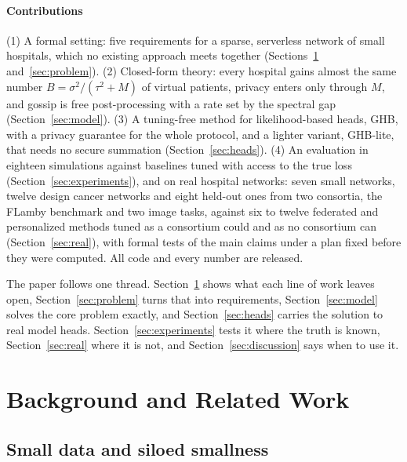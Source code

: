 \documentclass[acmsmall,screen,review]{acmart}
\theoremstyle{acmdefinition}
\begin{document}
\paragraph{Contributions} (1) A formal setting: five requirements for a sparse, serverless network of small hospitals, which no existing approach meets together (Sections~\ref{sec:related} and~\ref{sec:problem}). (2) Closed-form theory: every hospital gains almost the same number $B=\sigma^2/(\tau^2+M)$ of virtual patients, privacy enters only through $M$, and gossip is free post-processing with a rate set by the spectral gap (Section~\ref{sec:model}). (3) A tuning-free method for likelihood-based heads, GHB, with a privacy guarantee for the whole protocol, and a lighter variant, GHB-lite, that needs no secure summation (Section~\ref{sec:heads}). (4) An evaluation in eighteen simulations against baselines tuned with access to the true loss (Section~\ref{sec:experiments}), and on real hospital networks: seven small networks, twelve design cancer networks and eight held-out ones from two consortia, the FLamby benchmark and two image tasks, against six to twelve federated and personalized methods tuned as a consortium could and as no consortium can (Section~\ref{sec:real}), with formal tests of the main claims under a plan fixed before they were computed. All code and every number are released.

The paper follows one thread. Section~\ref{sec:related} shows what each line of work leaves open, Section~\ref{sec:problem} turns that into requirements, Section~\ref{sec:model} solves the core problem exactly, and Section~\ref{sec:heads} carries the solution to real model heads. Section~\ref{sec:experiments} tests it where the truth is known, Section~\ref{sec:real} where it is not, and Section~\ref{sec:discussion} says when to use it.

\section{Background and Related Work}\label{sec:related}

\subsection{Small data and siloed smallness}\label{sec:smallness}
\end{document}
